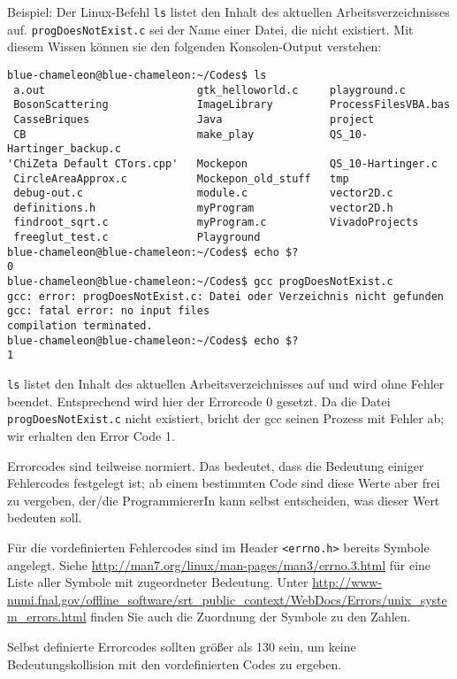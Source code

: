 Beispiel: Der Linux-Befehl \texttt{ls} listet den Inhalt des aktuellen Arbeitsverzeichnisses auf. \texttt{progDoesNotExist.c} sei der Name einer Datei, die nicht existiert. Mit diesem Wissen können sie den folgenden Konsolen-Output verstehen:

\begin{cmdbox}
\begin{verbatim}
blue-chameleon@blue-chameleon:~/Codes$ ls
 a.out                        gtk_helloworld.c     playground.c
 BosonScattering              ImageLibrary         ProcessFilesVBA.bas
 CasseBriques                 Java                 project
 CB                           make_play            QS_10-Hartinger_backup.c
'ChiZeta Default CTors.cpp'   Mockepon             QS_10-Hartinger.c
 CircleAreaApprox.c           Mockepon_old_stuff   tmp
 debug-out.c                  module.c             vector2D.c
 definitions.h                myProgram            vector2D.h
 findroot_sqrt.c              myProgram.c          VivadoProjects
 freeglut_test.c              Playground
blue-chameleon@blue-chameleon:~/Codes$ echo $?
0
blue-chameleon@blue-chameleon:~/Codes$ gcc progDoesNotExist.c
gcc: error: progDoesNotExist.c: Datei oder Verzeichnis nicht gefunden
gcc: fatal error: no input files
compilation terminated.
blue-chameleon@blue-chameleon:~/Codes$ echo $?
1
\end{verbatim}
\end{cmdbox}
\texttt{ls} listet den Inhalt des aktuellen Arbeitsverzeichnisses auf und wird ohne Fehler beendet. Entsprechend wird hier der Errorcode 0 gesetzt. Da die Datei \texttt{progDoesNotExist.c} nicht existiert, bricht der gcc seinen Prozess mit Fehler ab; wir erhalten den Error Code 1.

Errorcodes sind teilweise normiert. Das bedeutet, dass die Bedeutung einiger Fehlercodes festgelegt ist; ab einem bestimmten Code sind diese Werte aber frei zu vergeben, \ie der/die ProgrammiererIn kann selbst entscheiden, was dieser Wert bedeuten soll.

Für die vordefinierten Fehlercodes sind im Header \texttt{<errno.h>} bereits Symbole angelegt. Siehe \url{http://man7.org/linux/man-pages/man3/errno.3.html} für eine Liste aller Symbole mit zugeordneter Bedeutung. Unter \url{http://www-numi.fnal.gov/offline_software/srt_public_context/WebDocs/Errors/unix_system_errors.html} finden Sie auch die Zuordnung der Symbole zu den Zahlen.

Selbst definierte Errorcodes sollten größer als 130 sein, um keine Bedeutungskollision mit den vordefinierten Codes zu ergeben.

